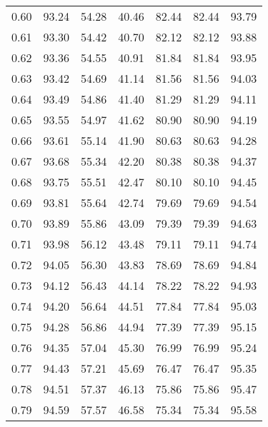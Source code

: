 \begin{tabular}{|c|c|c|c|c|c|c|}
      0.60 &     93.24 &     54.28 &      40.46 &   82.44 &      82.44 &         93.79 \\
      0.61 &     93.30 &     54.42 &      40.70 &   82.12 &      82.12 &         93.88 \\
      0.62 &     93.36 &     54.55 &      40.91 &   81.84 &      81.84 &         93.95 \\
      0.63 &     93.42 &     54.69 &      41.14 &   81.56 &      81.56 &         94.03 \\
      0.64 &     93.49 &     54.86 &      41.40 &   81.29 &      81.29 &         94.11 \\
      0.65 &     93.55 &     54.97 &      41.62 &   80.90 &      80.90 &         94.19 \\
      0.66 &     93.61 &     55.14 &      41.90 &   80.63 &      80.63 &         94.28 \\
      0.67 &     93.68 &     55.34 &      42.20 &   80.38 &      80.38 &         94.37 \\
      0.68 &     93.75 &     55.51 &      42.47 &   80.10 &      80.10 &         94.45 \\
      0.69 &     93.81 &     55.64 &      42.74 &   79.69 &      79.69 &         94.54 \\
      0.70 &     93.89 &     55.86 &      43.09 &   79.39 &      79.39 &         94.63 \\
      0.71 &     93.98 &     56.12 &      43.48 &   79.11 &      79.11 &         94.74 \\
      0.72 &     94.05 &     56.30 &      43.83 &   78.69 &      78.69 &         94.84 \\
      0.73 &     94.12 &     56.43 &      44.14 &   78.22 &      78.22 &         94.93 \\
      0.74 &     94.20 &     56.64 &      44.51 &   77.84 &      77.84 &         95.03 \\
      0.75 &     94.28 &     56.86 &      44.94 &   77.39 &      77.39 &         95.15 \\
      0.76 &     94.35 &     57.04 &      45.30 &   76.99 &      76.99 &         95.24 \\
      0.77 &     94.43 &     57.21 &      45.69 &   76.47 &      76.47 &         95.35 \\
      0.78 &     94.51 &     57.37 &      46.13 &   75.86 &      75.86 &         95.47 \\
      0.79 &     94.59 &     57.57 &      46.58 &   75.34 &      75.34 &         95.58 \\

\end{tabular}
